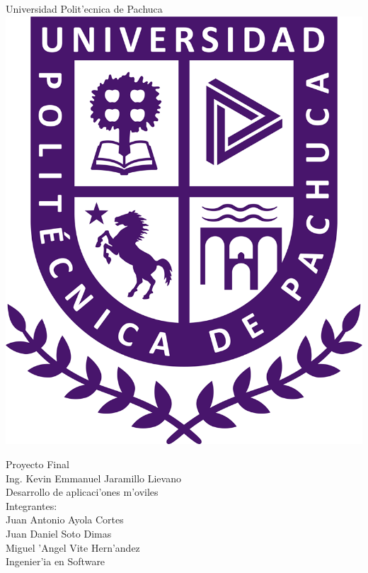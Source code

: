 \begin{titlepage}
	\begin{center}
		\sc \LARGE Universidad Polit'ecnica de Pachuca\\
		\bigskip
		\includegraphics[scale=0.2]{logo.png}
	\end{center}
	\bigskip
	\begin{center}
		\huge{Proyecto Final\\}
		\vspace*{1cm}
		\sc \LARGE Ing. Kevin Emmanuel Jaramillo Lievano\\
		\vspace*{0.5cm}
		\sc \LARGE Desarrollo de aplicaci'ones m'oviles\\
		\vspace*{0.5cm}
		\sc \LARGE Integrantes: \\
	    \sc \Large Juan Antonio Ayola Cortes \\
	    \sc \Large Juan Daniel Soto Dimas \\
		\sc \Large Miguel 'Angel Vite Hern'andez \\
		\vfill
		\sc Ingenier'ia en Software
	\end{center}
\end{titlepage}